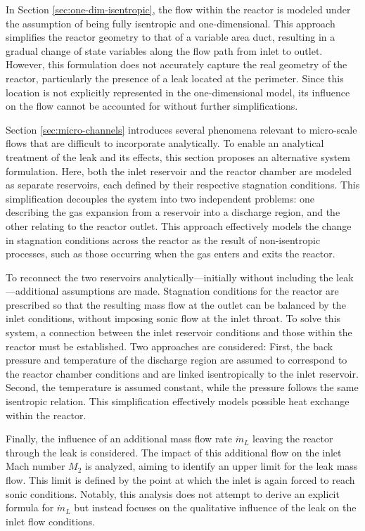 In Section \ref{sec:one-dim-isentropic}, the flow within the reactor is modeled under the assumption of being fully isentropic and one-dimensional. This approach simplifies the reactor geometry to that of a variable area duct, resulting in a gradual change of state variables along the flow path from inlet to outlet. However, this formulation does not accurately capture the real geometry of the reactor, particularly the presence of a leak located at the perimeter. Since this location is not explicitly represented in the one-dimensional model, its influence on the flow cannot be accounted for without further simplifications.

Section \ref{sec:micro-channels} introduces several phenomena relevant to micro-scale flows that are difficult to incorporate analytically. To enable an analytical treatment of the leak and its effects, this section proposes an alternative system formulation. Here, both the inlet reservoir and the reactor chamber are modeled as separate reservoirs, each defined by their respective stagnation conditions. This simplification decouples the system into two independent problems: one describing the gas expansion from a reservoir into a discharge region, and the other relating to the reactor outlet. This approach effectively models the change in stagnation conditions across the reactor as the result of non-isentropic processes, such as those occurring when the gas enters and exits the reactor.

To reconnect the two reservoirs analytically—initially without including the leak—additional assumptions are made. Stagnation conditions for the reactor are prescribed so that the resulting mass flow at the outlet can be balanced by the inlet conditions, without imposing sonic flow at the inlet throat. To solve this system, a connection between the inlet reservoir conditions and those within the reactor must be established. Two approaches are considered: First, the back pressure and temperature of the discharge region are assumed to correspond to the reactor chamber conditions and are linked isentropically to the inlet reservoir. Second, the temperature is assumed constant, while the pressure follows the same isentropic relation. This simplification effectively models possible heat exchange within the reactor.

Finally, the influence of an additional mass flow rate $\dot{m}_L$ leaving the reactor through the leak is considered. The impact of this additional flow on the inlet Mach number $M_2$ is analyzed, aiming to identify an upper limit for the leak mass flow. This limit is defined by the point at which the inlet is again forced to reach sonic conditions. Notably, this analysis does not attempt to derive an explicit formula for $\dot{m}_L$ but instead focuses on the qualitative influence of the leak on the inlet flow conditions.
\newpage

